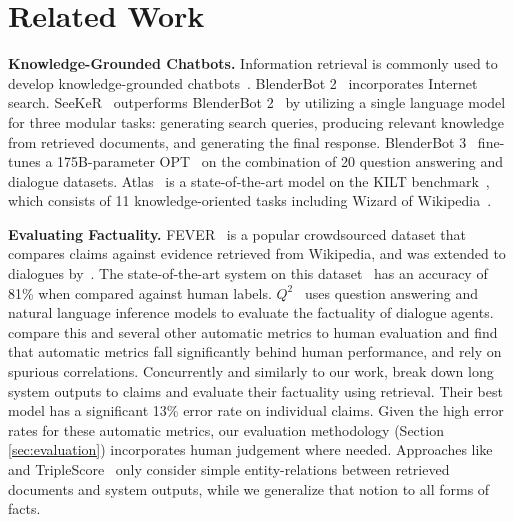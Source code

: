 \section{Related Work}
\label{sec:related-work}

{\bf Knowledge-Grounded Chatbots.}
Information retrieval is commonly used to develop knowledge-grounded chatbots~\cite{shuster-etal-2021-retrieval-augmentation}.
BlenderBot 2~\cite{chen2021blenderbot} incorporates Internet search. SeeKeR~\cite{shuster-etal-2022-language} outperforms BlenderBot 2~\cite{chen2021blenderbot} by utilizing a single language model for three modular tasks: generating search queries, producing relevant knowledge from retrieved documents, and generating the final response. 
BlenderBot 3~\cite{shuster2022blenderbot} fine-tunes a 175B-parameter OPT~\cite{zhang2022opt} on the combination of 20 question answering and dialogue datasets. 
Atlas~\cite{izacard2022atlas} is a state-of-the-art model on the KILT benchmark~\cite{petroni-etal-2021-kilt}, which consists of 11 knowledge-oriented tasks including Wizard of Wikipedia~\cite{dinan2019wizard}.

{\bf Evaluating Factuality.}
\label{section:related_factuality_evaluation}
FEVER~\cite{thorne-etal-2018-fever} is a popular crowdsourced dataset that compares claims against evidence retrieved from Wikipedia, and was extended to dialogues by~\citet{gupta-etal-2022-dialfact}. The state-of-the-art system on this dataset~\cite{krishna-etal-2022-proofver} has an accuracy of 81\% when compared against human labels.
$Q^2$~\cite{honovich-etal-2021-q2} uses question answering and natural language inference models to evaluate the factuality of dialogue agents.
\citet{dziri-etal-2022-evaluating} compare this and several other automatic metrics to human evaluation and find that automatic metrics fall significantly behind human performance, and rely on spurious correlations.
Concurrently and similarly to our work, \citet{min2023factscore} break down long system outputs to claims and evaluate their factuality using retrieval. Their best model has a significant 13\% error rate on individual claims. Given the high error rates for these automatic metrics, our evaluation methodology (Section \ref{sec:evaluation}) incorporates human judgement where needed.
Approaches like \citet{qian2023optimizing} and TripleScore~\cite{assessing-factual-2019} only consider simple entity-relations between retrieved documents and system outputs, while we generalize that notion to all forms of facts.

